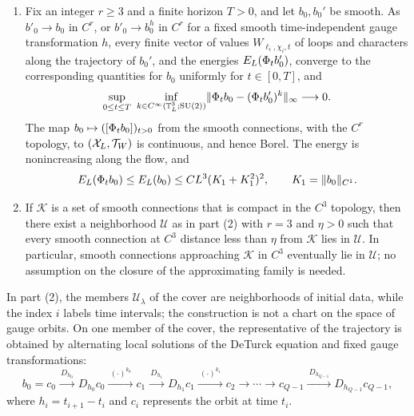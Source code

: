 \begin{theorem}
\begin{enumerate}
\item Fix an integer $r\ge3$ and a finite horizon $T>0$, and let $b_0,b_0'$ be smooth. As $b'_0\to b_0$ in $C^r$, or $b'_0\to b_0^h$ in $C^r$ for a fixed smooth time-independent gauge transformation $h$, every finite vector of values $W_{\ell_i,\chi_i,t}$ of loops and characters along the trajectory of $b_0'$, and the energies $E_L(\Phi_tb'_0)$, converge to the corresponding quantities for $b_0$ uniformly for $t\in[0,T]$, and
\[
 \sup_{0\le t\le T}\ \inf_{k\in C^\infty(\mathbb T_L^3;\mathrm{SU}(2))}\lVert \Phi_tb_0-(\Phi_tb'_0)^k\rVert_\infty\longrightarrow0 .
\]
The map $b_0\mapsto([\Phi_tb_0])_{t>0}$ from the smooth connections, with the $C^r$ topology, to $(\mathcal X_L,\mathcal T_W)$ is continuous, and hence Borel. The energy is nonincreasing along the flow, and
\[
 E_L(\Phi_tb_0)\le E_L(b_0)\le CL^3(K_1+K_1^2)^2,\qquad K_1=\lVert b_0\rVert_{C^1}.
\]
\item If $\mathscr K$ is a set of smooth connections that is compact in the $C^3$ topology, then there exist a neighborhood $\mathscr U$ as in part (2) with $r=3$ and $\eta>0$ such that every smooth connection at $C^3$ distance less than $\eta$ from $\mathscr K$ lies in $\mathscr U$. In particular, smooth connections approaching $\mathscr K$ in $C^3$ eventually lie in $\mathscr U$; no assumption on the closure of the approximating family is needed.
\end{enumerate}
\end{theorem}

In part (2), the members $\mathscr U_\lambda$ of the cover are neighborhoods of initial data, while the index $i$ labels time intervals; the construction is not a chart on the space of gauge orbits. On one member of the cover, the representative of the trajectory is obtained by alternating local solutions of the DeTurck equation and fixed gauge transformations:
\begin{equation}\label{ch21:eq:atlas-diagram}
 b_0=c_0\xrightarrow{\ D_{h_0}\ }D_{h_0}c_0\xrightarrow{\ (\cdot)^{k_0}\ }c_1\xrightarrow{\ D_{h_1}\ }D_{h_1}c_1\xrightarrow{\ (\cdot)^{k_1}\ }c_2\longrightarrow\cdots\longrightarrow c_{Q-1}\xrightarrow{\ D_{h_{Q-1}}\ }D_{h_{Q-1}}c_{Q-1},
\end{equation}
where $h_i=t_{i+1}-t_i$ and $c_i$ represents the orbit at time $t_i$.


